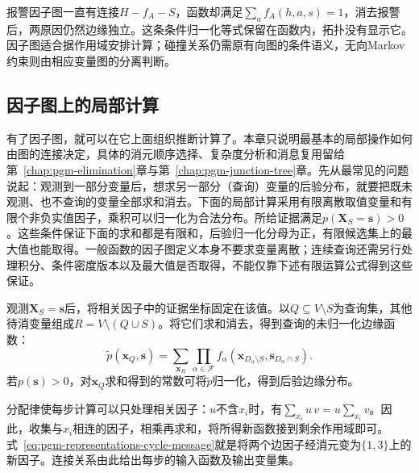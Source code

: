 报警因子图一直有连接$H-f_A-S$，函数却满足$\sum_a f_A(h,a,s)=1$，消去报警后，两原因仍然边缘独立。这条条件归一化等式保留在函数内，拓扑没有显示它。因子图适合据作用域安排计算；碰撞关系仍需原有向图的条件语义，无向Markov约束则由相应变量图的分离判断。

\subsection{因子图上的局部计算}
\label{sec:pgm-representations-local-computation}

有了因子图，就可以在它上面组织推断计算了。本章只说明最基本的局部操作如何由图的连接决定，具体的消元顺序选择、复杂度分析和消息复用留给第~\ref{chap:pgm-elimination}章与第~\ref{chap:pgm-junction-tree}章。先从最常见的问题说起：观测到一部分变量后，想求另一部分（查询）变量的后验分布，就要把既未观测、也不查询的变量全部求和消去。下面的局部计算采用有限离散取值变量和有限个非负实值因子，乘积可以归一化为合法分布。所给证据满足$p(\bm X_S=\bm s)>0$。这些条件保证下面的求和都是有限和，后验归一化分母为正，有限候选集上的最大值也能取得。一般函数的因子图定义本身不要求变量离散；连续查询还需另行处理积分、条件密度版本以及最大值是否取得，不能仅靠下述有限运算公式得到这些保证。

观测$\bm{X}_S=\bm{s}$后，将相关因子中的证据坐标固定在该值。以$Q\subseteq V\setminus S$为查询集，其他待消变量组成$R=V\setminus(Q\cup S)$。将它们求和消去，得到查询的未归一化边缘函数：
\begin{equation}
  \widetilde p(\bm{x}_Q,\bm{s})
  =\sum_{\bm{x}_R}
  \prod_{\alpha\in\mathcal{F}}
  f_\alpha(\bm{x}_{D_\alpha\setminus S},\bm{s}_{D_\alpha\cap S}).
  \label{eq:pgm-representations-marginal-query}
\end{equation}
若$p(\bm{s})>0$，对$\bm{x}_Q$求和得到的常数可将$\widetilde p$归一化，得到后验边缘分布。

分配律使每步计算可以只处理相关因子：$u$不含$x_i$时，有$\sum_{x_i}u\,v=u\sum_{x_i}v$。因此，收集与$x_i$相连的因子，相乘再求和，将所得新函数接到剩余作用域即可。式~\eqref{eq:pgm-representations-cycle-message}就是将两个边因子经消元变为$\{1,3\}$上的新因子。连接关系由此给出每步的输入函数及输出变量集。

